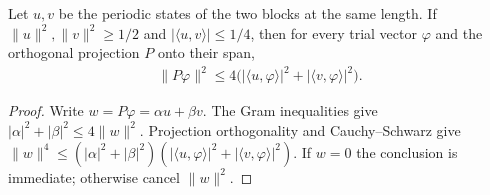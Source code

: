 \begin{lemma}
    \label{lem:uncle_periodic_sector_projection_bound}
    \leanok
    Let $u,v$ be the periodic states of the two blocks at the same
    length. If $\|u\|^2,\|v\|^2\ge1/2$ and
    $|\langle u,v\rangle|\le1/4$, then for every trial vector $\varphi$
    and the orthogonal projection $P$ onto their span,
    \begin{align}
        \|P\varphi\|^2\le
        4\bigl(|\langle u,\varphi\rangle|^2+
        |\langle v,\varphi\rangle|^2\bigr).
        \label{eq:uncle_variational_two_sector_overlap}
    \end{align}
\end{lemma}
\begin{proof}\leanok
    Write $w=P\varphi=\alpha u+\beta v$. The Gram inequalities give
    $|\alpha|^2+|\beta|^2\le4\|w\|^2$.
    Projection orthogonality and Cauchy--Schwarz give
    $\|w\|^4\le(|\alpha|^2+|\beta|^2)
        (|\langle u,\varphi\rangle|^2+|\langle v,\varphi\rangle|^2)$.
    If $w=0$ the conclusion is immediate; otherwise cancel $\|w\|^2$.
\end{proof}

